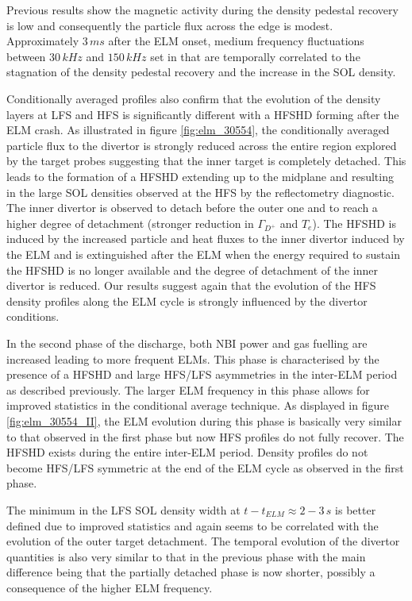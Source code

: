\documentclass[12pt]{iopart}
\begin{document}
Previous results\cite{Laggner2018ppcf} show the magnetic activity during the density pedestal recovery is low and consequently the particle flux across the edge is modest. Approximately $3\,ms$ after the ELM onset, medium frequency fluctuations between $30\,kHz$ and $150\,kHz$ set in that are temporally correlated to the stagnation of the density pedestal recovery and the increase in the SOL density.

Conditionally averaged profiles also confirm that the evolution of the density layers at LFS and HFS is significantly different with a HFSHD forming after the ELM crash. As illustrated in figure \ref{fig:elm_30554}, the conditionally averaged particle flux to the divertor is strongly reduced across the entire region explored by the target probes suggesting that the inner target is completely detached. This leads to the formation of a HFSHD extending up to the midplane and resulting in the large SOL densities observed at the HFS by the reflectometry diagnostic. The inner divertor is observed to detach before the outer one and to reach a higher degree of detachment (stronger reduction in $\Gamma_{D^{+}}$ and $T_e$). The HFSHD is induced by the increased particle and heat fluxes to the inner divertor induced by the ELM and is extinguished after the ELM when the energy required to sustain the HFSHD is no longer available and the degree of detachment of the inner divertor is reduced. Our results suggest again that the evolution of the HFS density profiles along the ELM cycle 
is strongly influenced by the divertor conditions.

In the second phase of the discharge, both NBI power and gas fuelling are increased leading to more frequent ELMs. This phase is characterised by the presence of a HFSHD and large HFS/LFS asymmetries in the inter-ELM period as described previously. The larger ELM frequency in this phase allows for improved statistics in the conditional average technique. As displayed in figure \ref{fig:elm_30554_II}, the ELM evolution during this phase is basically very similar to that observed in the first phase but now HFS profiles do not fully recover. The HFSHD exists during the entire inter-ELM period. Density profiles do not become HFS/LFS symmetric at the end of the ELM cycle as observed in the first phase.

The minimum in the LFS SOL density width at $t-t_{ELM} \approx 2-3\,s$ is better defined due to improved statistics and again seems to be correlated with the evolution of the outer target detachment. The temporal evolution of the divertor quantities is also very similar to that in the previous phase with the main difference being that the partially detached phase is now shorter, possibly a consequence of the higher ELM frequency.
\end{document}
